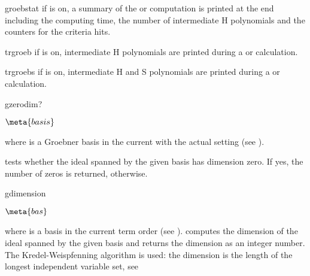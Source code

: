 \begin{Switch}{groebstat}
if  is on, a summary of the 
 or  computation is printed
at the end 
including the computing time, the number of intermediate
H polynomials and the counters for the criteria hits.
\end{Switch}

\begin{Switch}{trgroeb}
if  is on, intermediate H polynomials are 
printed during a  
or  calculation.
\end{Switch}

\begin{Switch}{trgroebs}
if  is on, intermediate H and S polynomials are 
printed during a  or  calculation.
\end{Switch}

\begin{Operator}{gzerodim?} 
\begin{Syntax}

  \(\meta{basis}\)

\end{Syntax}
where  is a Groebner basis in the current 
 with the actual setting 
(see ). 


 tests whether the ideal spanned by the given basis 
has dimension zero. If yes, the number of zeros is returned,
 otherwise.
\end{Operator}


\begin{Operator}{gdimension}
\begin{Syntax}

     \(\meta{bas}\) 

\end{Syntax}
where  is a  basis in the current
term order (see ). 
 computes the dimension of the ideal
spanned by the given basis and returns the dimension as an integer
number. The Kredel-Weispfenning algorithm is used: the dimension
is the length of the longest independent variable set,
see 
\end{Operator}



